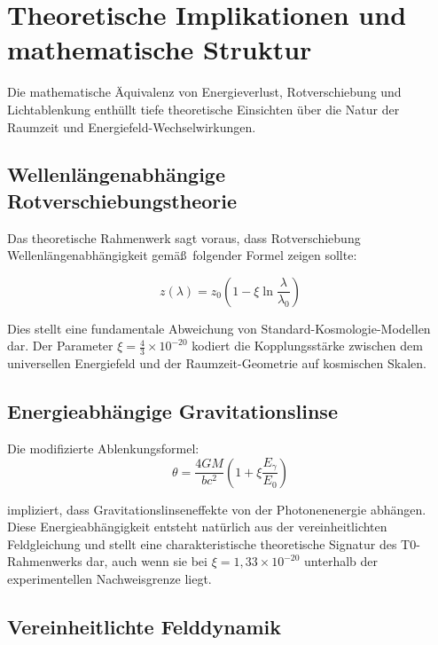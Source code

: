 \documentclass[12pt,a4paper]{article}
\theoremstyle{definition}
\begin{document}
	\section{Theoretische Implikationen und mathematische Struktur}
	
	Die mathematische \"Aquivalenz von Energieverlust, Rotverschiebung und Lichtablenkung enth\"ullt tiefe theoretische Einsichten \"uber die Natur der Raumzeit und Energiefeld-Wechselwirkungen.
	
	\subsection{Wellenl\"angenabh\"angige Rotverschiebungstheorie}
	
	Das theoretische Rahmenwerk sagt voraus, dass Rotverschiebung Wellenl\"angenabh\"angigkeit gem\"a\ss\ folgender Formel zeigen sollte:
	
	\begin{equation}
		z(\lambda) = z_0\left(1 - \xi \ln\frac{\lambda}{\lambda_0}\right)
	\end{equation}
	
	Dies stellt eine fundamentale Abweichung von Standard-Kosmologie-Modellen dar. Der Parameter $\xi = \frac{4}{3} \times 10^{-20}$ kodiert die Kopplungsst\"arke zwischen dem universellen Energiefeld und der Raumzeit-Geometrie auf kosmischen Skalen.
	
	\subsection{Energieabh\"angige Gravitationslinse}
	
	Die modifizierte Ablenkungsformel:
	\begin{equation}
		\theta = \frac{4GM}{bc^2}\left(1 + \xi \frac{E_\gamma}{E_0}\right)
	\end{equation}
	
	impliziert, dass Gravitationslinseneffekte von der Photonenenergie abh\"angen. Diese Energieabh\"angigkeit entsteht nat\"urlich aus der vereinheitlichten Feldgleichung und stellt eine charakteristische theoretische Signatur des T0-Rahmenwerks dar, auch wenn sie bei $\xi = 1{,}33 \times 10^{-20}$ unterhalb der experimentellen Nachweisgrenze liegt.
	
	\subsection{Vereinheitlichte Felddynamik}
	
\end{document}
